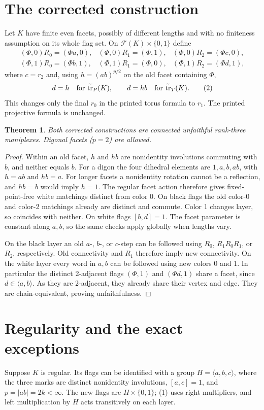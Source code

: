 \documentclass[a4paper,11pt]{article}
\newtheorem{theorem}{Theorem}\newtheorem{lemma}[theorem]{Lemma}
\begin{document}
\section{The corrected construction}
Let $K$ have finite even facets, possibly of different lengths and with no
finiteness assumption on its whole flag set. On
$\mathcal F(K)\times\{0,1\}$ define
\[
\begin{array}{lll}
(\Phi,0)R_0=(\Phi a,0),& (\Phi,0)R_1=(\Phi,1),&
(\Phi,0)R_2=(\Phi c,0),\\
(\Phi,1)R_0=(\Phi b,1),& (\Phi,1)R_1=(\Phi,0),&
(\Phi,1)R_2=(\Phi d,1),
\end{array}\tag{1}
\]
where $c=r_2$ and, using $h=(ab)^{p/2}$ on the old facet containing $\Phi$,
\[
 d=h\quad\hbox{for }\widetilde{\operatorname{tr}}_P(K),\qquad
 d=hb\quad\hbox{for }\widetilde{\operatorname{tr}}_T(K).\tag{2}
\]
This changes only the final $r_0$ in the printed torus formula to $r_1$.
The printed projective formula is unchanged.

\begin{theorem}\label{construction}
Both corrected constructions are connected unfaithful rank-three maniplexes.
Digonal facets ($p=2$) are allowed.
\end{theorem}
\begin{proof}
Within an old facet, $h$ and $hb$ are nonidentity involutions commuting
with $b$, and neither equals $b$. For a digon the four dihedral elements
are $1,a,b,ab$, with $h=ab$ and $hb=a$. For longer facets a nonidentity
rotation cannot be a reflection, and $hb=b$ would imply $h=1$. The regular
facet action therefore gives fixed-point-free white matchings distinct from
color 0. On black flags the old color-0 and color-2 matchings already are
distinct and commute. Color 1 changes layer, so coincides with neither.
On white flags $[b,d]=1$. The facet parameter is constant along $a,b$,
so the same checks apply globally when lengths vary.

On the black layer an old $a$-, $b$-, or $c$-step can be followed using
$R_0$, $R_1R_0R_1$, or $R_2$, respectively. Old connectivity and $R_1$
therefore imply new connectivity. On the white layer every word in $a,b$
can be followed using new colors 0 and 1. In particular the distinct
2-adjacent flags $(\Phi,1)$ and $(\Phi d,1)$ share a facet, since
$d\in\langle a,b\rangle$. As they are 2-adjacent, they already share their
vertex and edge. They are chain-equivalent, proving unfaithfulness.
\end{proof}

\section{Regularity and the exact exceptions}
Suppose $K$ is regular. Its flags can be identified with a group
$H=\langle a,b,c\rangle$, where the three marks are distinct nonidentity
involutions, $[a,c]=1$, and $p=|ab|=2k<\infty$. The new flags are
$H\times\{0,1\}$; (1) uses right multipliers, and left multiplication
by $H$ acts transitively on each layer.
\end{document}
